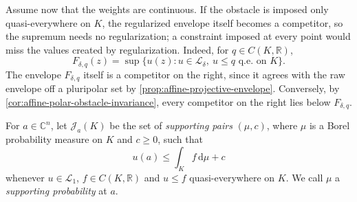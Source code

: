 Assume now that the weights are continuous. If the obstacle is imposed only quasi-everywhere on $K$, the regularized envelope itself becomes a competitor, so the supremum needs no regularization; a constraint imposed at every point would miss the values created by regularization. Indeed, for $q\in C(K,\mathbb R)$,
\begin{equation}\label{eq:affine-qe-pointwise-envelope}
 F_{\delta,q}(z)=\sup\{u(z):u\in\mathcal L_\delta,
                          \ u\leq q\text{ q.e. on }K\}.
\end{equation}
The envelope $F_{\delta,q}$ itself is a competitor on the right, since it agrees with the raw envelope off a pluripolar set by \cref{prop:affine-projective-envelope}. Conversely, by \cref{cor:affine-polar-obstacle-invariance}, every competitor on the right lies below $F_{\delta,q}$.

For $a\in\mathbb C^n$, let $\mathcal J_a(K)$ be the set of \emph{supporting pairs} $(\mu,c)$, where $\mu$ is a Borel probability measure on $K$ and $c\geq0$, such that
\begin{equation}\label{eq:affine-supporting-probability-tests}
 u(a)\leq\int_K f\,\mathrm{d}\mu+c
\end{equation}
whenever $u\in\mathcal L_1$, $f\in C(K,\mathbb R)$ and $u\leq f$ quasi-everywhere on $K$. We call $\mu$ a \emph{supporting probability} at $a$.

